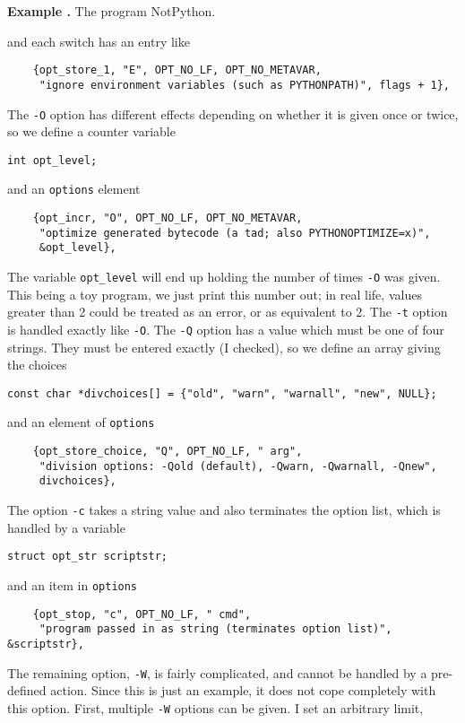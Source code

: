 \documentclass{article}
\newcounter{exnum}
\newenvironment{example}[1]
{\par\smallskip\noindent\refstepcounter{exnum}\textbf{Example
    \theexnum.} The program #1.\par\nopagebreak}
{\par\smallskip}
\renewcommand{\tt}{\texttt}
\begin{document}
\begin{example}{NotPython}
  \noindent and each switch has an entry like
{\small
\begin{verbatim}
    {opt_store_1, "E", OPT_NO_LF, OPT_NO_METAVAR,
     "ignore environment variables (such as PYTHONPATH)", flags + 1},
\end{verbatim}}
  \noindent The \tt{-O} option has different effects depending on
  whether it is given once or twice, so we define a counter variable 
{\small
\begin{verbatim}
int opt_level;
\end{verbatim}}
  \noindent and an \tt{options} element
{\small
\begin{verbatim}
    {opt_incr, "O", OPT_NO_LF, OPT_NO_METAVAR,
     "optimize generated bytecode (a tad; also PYTHONOPTIMIZE=x)",
     &opt_level},
\end{verbatim}}
  \noindent The variable \tt{opt\_level} will end up holding the
  number of times \tt{-O} was given. This being a toy program, we just
  print this number out; in real life, values greater than 2 could be
  treated as an error, or as equivalent to 2. The \tt{-t} option is
  handled exactly like \tt{-O}. The \tt{-Q} option has a value
  which must be one of four strings. They must be entered exactly (I
  checked), so we define an array giving the choices
{\small
\begin{verbatim}
const char *divchoices[] = {"old", "warn", "warnall", "new", NULL};
\end{verbatim}}
  \noindent and an element of \tt{options}
{\small
\begin{verbatim}
    {opt_store_choice, "Q", OPT_NO_LF, " arg",
     "division options: -Qold (default), -Qwarn, -Qwarnall, -Qnew",
     divchoices},
\end{verbatim}}
  \noindent The option \tt{-c} takes a string value and also
  terminates the option list, which is handled by a variable
{\small
\begin{verbatim}
struct opt_str scriptstr;
\end{verbatim}}
  \noindent and an item in \tt{options}
{\small
\begin{verbatim}
    {opt_stop, "c", OPT_NO_LF, " cmd",
     "program passed in as string (terminates option list)", &scriptstr},
\end{verbatim}}
  \noindent The remaining option, \tt{-W}, is fairly complicated, and
  cannot be handled by a pre-defined action. Since this is just an
  example, it does not cope completely with this option. First,
  multiple \tt{-W} options can be given. I set an arbitrary limit,

\end{example}
\end{document}
